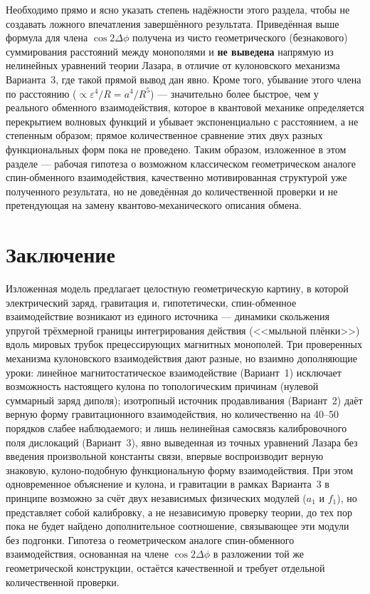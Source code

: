 \documentclass[12pt,a4paper]{article}
\begin{document}
Необходимо прямо и ясно указать степень надёжности этого раздела,
чтобы не создавать ложного впечатления завершённого результата.
Приведённая выше формула для члена $\cos2\Delta\phi$ получена из
чисто геометрического (безнакового) суммирования расстояний между
монополями и \textbf{не выведена} напрямую из нелинейных уравнений
теории Лазара, в отличие от кулоновского механизма Варианта~3, где
такой прямой вывод дан явно. Кроме того, убывание этого члена по
расстоянию ($\propto\varepsilon^4/R=a^4/R^5$) --- значительно более
быстрое, чем у реального обменного взаимодействия, которое в
квантовой механике определяется перекрытием волновых функций и
убывает экспоненциально с расстоянием, а не степенным образом; прямое
количественное сравнение этих двух разных функциональных форм пока не
проведено. Таким образом, изложенное в этом разделе --- рабочая
гипотеза о возможном классическом геометрическом аналоге
спин-обменного взаимодействия, качественно мотивированная структурой
уже полученного результата, но не доведённая до количественной
проверки и не претендующая на замену квантово-механического описания
обмена.

\section{Заключение}

Изложенная модель предлагает целостную геометрическую картину, в
которой электрический заряд, гравитация и, гипотетически,
спин-обменное взаимодействие возникают из единого источника ---
динамики скольжения упругой трёхмерной границы интегрирования действия
(<<мыльной плёнки>>) вдоль мировых трубок прецессирующих магнитных
монополей. Три проверенных механизма кулоновского взаимодействия дают
разные, но взаимно дополняющие уроки: линейное магнитостатическое
взаимодействие (Вариант~1) исключает возможность настоящего кулона по
топологическим причинам (нулевой суммарный заряд диполя); изотропный
источник продавливания (Вариант~2) даёт верную форму гравитационного
взаимодействия, но количественно на 40--50 порядков слабее
наблюдаемого; и лишь нелинейная самосвязь калибровочного поля
дислокаций (Вариант~3), явно выведенная из точных уравнений Лазара без
введения произвольной константы связи, впервые воспроизводит верную
знаковую, кулоно-подобную функциональную форму взаимодействия. При
этом одновременное объяснение и кулона, и гравитации в рамках
Варианта~3 в принципе возможно за счёт двух независимых физических
модулей ($a_1$ и $f_1$), но представляет собой калибровку, а не
независимую проверку теории, до тех пор пока не будет найдено
дополнительное соотношение, связывающее эти модули без подгонки.
Гипотеза о геометрическом аналоге спин-обменного взаимодействия,
основанная на члене $\cos2\Delta\phi$ в разложении той же
геометрической конструкции, остаётся качественной и требует отдельной
количественной проверки.
\end{document}
